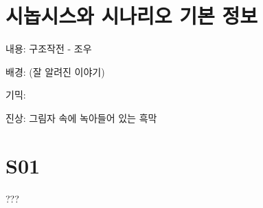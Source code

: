 \documentclass{report}
\begin{document}
	\section{시놉시스와 시나리오 기본 정보}
		내용: 구조작전 - 조우
		
		배경: (잘 알려진 이야기)
		
		기믹: 
		
		진상: 그림자 속에 녹아들어 있는 흑막
	
	\section{S01}
		???
\end{document}
